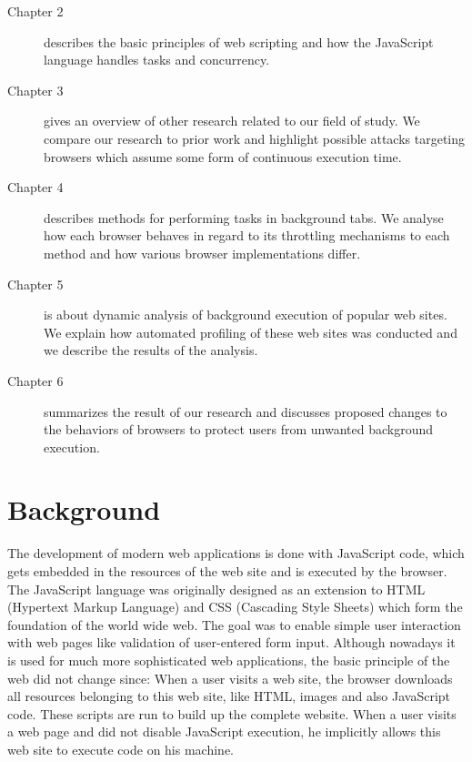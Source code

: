 \documentclass[
	ruledheaders=section,%
	class=report,%
	thesis={type=bachelor},%
	accentcolor=9c,%
	custommargins=true,%
	marginpar=false,%
	parskip=half-,%
	fontsize=11pt,%
]{tudapub}
\begin{document}
  \begin{description}
  \item[Chapter 2] describes the basic principles of web scripting and how the JavaScript language handles tasks and concurrency.
    
  \item[Chapter 3] gives an overview of other research related to our field of study. We compare our research to prior work and highlight possible attacks targeting browsers which assume some form of continuous execution time.
    
  \item[Chapter 4] describes methods for performing tasks in background tabs. We analyse how each browser behaves in regard to its throttling mechanisms to each method and how various browser implementations differ.
    
  \item[Chapter 5] is about dynamic analysis of background execution of popular web sites. We explain how automated profiling of these web sites was conducted and we describe the results of the analysis.
    
  \item[Chapter 6] summarizes the result of our research and discusses proposed changes to the behaviors of browsers to protect users from unwanted background execution.
  \end{description} 

  
  \newpage
  \chapter{Background}
  
  The development of modern web applications is done with JavaScript code, which gets embedded in the resources of the web site and is executed by the browser. The JavaScript language was originally designed as an extension to HTML (Hypertext Markup Language) and CSS (Cascading Style Sheets) which form the foundation of the world wide web. The goal was to enable simple user interaction with web pages like validation of user-entered form input. Although nowadays it is used for much more sophisticated web applications, the basic principle of the web did not change since: When a user visits a web site, the browser downloads all resources belonging to this web site, like HTML, images and also JavaScript code. These scripts are run to build up the complete website. When a user visits a web page and did not disable JavaScript execution, he implicitly allows this web site to execute code on his machine.
\end{document}
